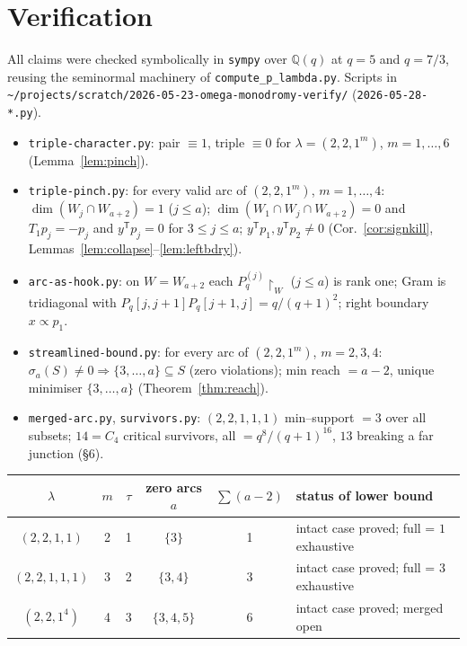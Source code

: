 \documentclass[11pt]{article}
\theoremstyle{definition}
\newcommand{\Pq}{P_{q}}
\newcommand{\la}{\lambda}
\newcommand{\W}{W}
\begin{document}
\section{Verification}

All claims were checked symbolically in \texttt{sympy} over $\mathbb Q(q)$ at $q=5$ and
$q=7/3$, reusing the seminormal machinery of \texttt{compute\_p\_lambda.py}. Scripts in
\texttt{\~{}/projects/scratch/2026-05-23-omega-monodromy-verify/} (\texttt{2026-05-28-*.py}).

\begin{itemize}
\item \texttt{triple-character.py}: pair $\equiv1$, triple $\equiv0$ for $\la=(2,2,1^m)$,
$m=1,\dots,6$ (Lemma~\ref{lem:pinch}).
\item \texttt{triple-pinch.py}: for every valid arc of $(2,2,1^m)$, $m=1,\dots,4$:
$\dim(\W_j\cap\W_{a+2})=1$ ($j\le a$); $\dim(\W_1\cap\W_j\cap\W_{a+2})=0$ and
$T_1p_j=-p_j$ and $y^{\mathsf T}p_j=0$ for $3\le j\le a$; $y^{\mathsf T}p_1,y^{\mathsf T}p_2\ne0$
(Cor.~\ref{cor:signkill}, Lemmas~\ref{lem:collapse}--\ref{lem:leftbdry}).
\item \texttt{arc-as-hook.py}: on $\W=\W_{a+2}$ each $\Pq^{(j)}\restriction_\W$ ($j\le a$)
is rank one; Gram is tridiagonal with $\Pq[j,j{+}1]\Pq[j{+}1,j]=q/(q+1)^2$; right boundary
$x\propto p_1$.
\item \texttt{streamlined-bound.py}: for every arc of $(2,2,1^m)$, $m=2,3,4$:
$\sigma_a(S)\ne0\Rightarrow\{3,\dots,a\}\subseteq S$ (zero violations); min reach $=a-2$,
unique minimiser $\{3,\dots,a\}$ (Theorem~\ref{thm:reach}).
\item \texttt{merged-arc.py}, \texttt{survivors.py}: $(2,2,1,1,1)$ min--support $=3$ over
all subsets; $14=C_4$ critical survivors, all $=q^8/(q+1)^{16}$, $13$ breaking a far
junction (\S6).
\end{itemize}

\begin{center}
\begin{tabular}{c|c|c|c|c|l}
$\la$ & $m$ & $\tau$ & zero arcs $a$ & $\sum(a-2)$ & status of lower bound\\\hline
$(2,2,1,1)$   & 2 & 1 & $\{3\}$       & 1 & intact case proved; full = $1$ exhaustive\\
$(2,2,1,1,1)$ & 3 & 2 & $\{3,4\}$     & 3 & intact case proved; full = $3$ exhaustive\\
$(2,2,1^4)$   & 4 & 3 & $\{3,4,5\}$   & 6 & intact case proved; merged open\\
\end{tabular}
\end{center}
\end{document}
